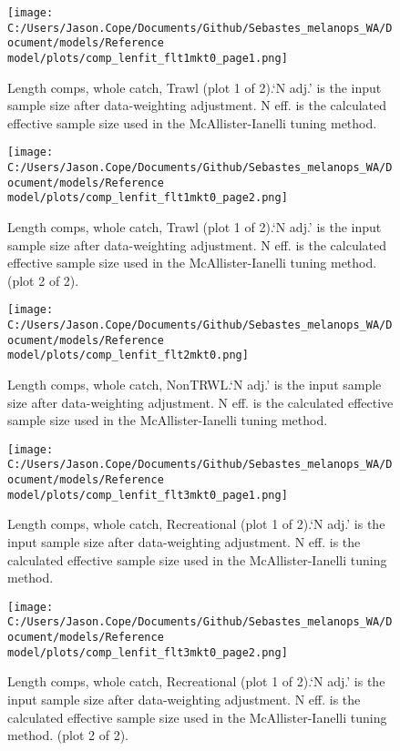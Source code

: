 \documentclass[11pt,
  english,
  letterpaper,
]{article}
\begin{document}
\begin{figure}
\centering
\texttt{[image: C:/Users/Jason.Cope/Documents/Github/Sebastes\_melanops\_WA/Document/models/Reference model/plots/comp\_lenfit\_flt1mkt0\_page1.png]}
\caption{Length comps, whole catch, Trawl (plot 1 of 2).`N adj.' is the input sample size after data-weighting adjustment. N eff. is the calculated effective sample size used in the McAllister-Ianelli tuning method.\label{fig:comp_lenfit_flt1mkt0_page1}}
\end{figure}

\begin{figure}
\centering
\texttt{[image: C:/Users/Jason.Cope/Documents/Github/Sebastes\_melanops\_WA/Document/models/Reference model/plots/comp\_lenfit\_flt1mkt0\_page2.png]}
\caption{Length comps, whole catch, Trawl (plot 1 of 2).`N adj.' is the input sample size after data-weighting adjustment. N eff. is the calculated effective sample size used in the McAllister-Ianelli tuning method. (plot 2 of 2).\label{fig:comp_lenfit_flt1mkt0_page2}}
\end{figure}

\begin{figure}
\centering
\texttt{[image: C:/Users/Jason.Cope/Documents/Github/Sebastes\_melanops\_WA/Document/models/Reference model/plots/comp\_lenfit\_flt2mkt0.png]}
\caption{Length comps, whole catch, NonTRWL.`N adj.' is the input sample size after data-weighting adjustment. N eff. is the calculated effective sample size used in the McAllister-Ianelli tuning method.\label{fig:comp_lenfit_flt2mkt0}}
\end{figure}

\begin{figure}
\centering
\texttt{[image: C:/Users/Jason.Cope/Documents/Github/Sebastes\_melanops\_WA/Document/models/Reference model/plots/comp\_lenfit\_flt3mkt0\_page1.png]}
\caption{Length comps, whole catch, Recreational (plot 1 of 2).`N adj.' is the input sample size after data-weighting adjustment. N eff. is the calculated effective sample size used in the McAllister-Ianelli tuning method.\label{fig:comp_lenfit_flt3mkt0_page1}}
\end{figure}

\begin{figure}
\centering
\texttt{[image: C:/Users/Jason.Cope/Documents/Github/Sebastes\_melanops\_WA/Document/models/Reference model/plots/comp\_lenfit\_flt3mkt0\_page2.png]}
\caption{Length comps, whole catch, Recreational (plot 1 of 2).`N adj.' is the input sample size after data-weighting adjustment. N eff. is the calculated effective sample size used in the McAllister-Ianelli tuning method. (plot 2 of 2).\label{fig:comp_lenfit_flt3mkt0_page2}}
\end{figure}
\end{document}
